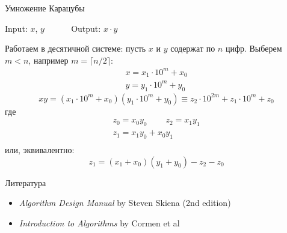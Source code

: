 
\begin{frame}[fragile]{Умножение Карацубы}

Input: $x$, $y$ ~~~~~ Output: $x \cdot y$

Работаем в десятичной системе: пусть $x$ и $y$ содержат по $n$ цифр. Выберем $m<n$, например $m = \lceil n/2 \rceil$:%
%
$$
\begin{gathered}
x = x_1 \cdot 10^m + x_0\\
y = y_1 \cdot 10^m + y_0
\end{gathered}
$$%
$$
xy = (x_1 \cdot 10^m + x_0)(y_1 \cdot 10^m + y_0)
     \equiv z_2 \cdot 10^{2m} + z_1 \cdot 10^{m} + z_0
$$%
%
где%
$$
\begin{gathered}
z_0 = x_0 y_0   ~~~~~~~~~~  z_2 = x_1 y_1\\
z_1 = x_1 y_0 + x_0 y_1\\
\end{gathered}
$$%
или, эквивалентно:
$$
z_1 = (x_1 + x_0)(y_1 + y_0) - z_2 - z_0
$$


\end{frame}



\begin{frame}{Литература}

\begin{itemize}
  \item {\em Algorithm Design Manual} by Steven Skiena (2nd edition)
   \item {\em Introduction to Algorithms} by Cormen et al
\end{itemize}%

\end{frame}

